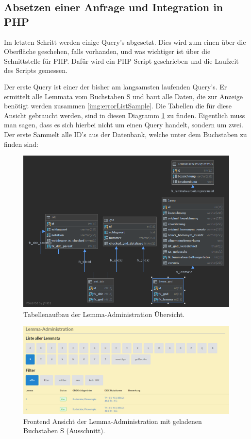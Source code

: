 \subsection{Absetzen einer Anfrage und Integration in PHP}

Im letzten Schritt werden einige Query’s abgesetzt. Dies wird zum einen über die Oberfläche geschehen, falls vorhanden, und was wichtiger ist über die Schnittstelle für PHP. Dafür wird ein PHP-Script geschrieben und die Laufzeit des Scripts gemessen.

Der erste Query ist einer der bisher am langsamsten laufenden Query’s. Er ermittelt alle Lemmata vom Buchstaben S und baut alle Daten, die zur Anzeige benötigt werden zusammen \ref{img:errorListSample}. Die Tabellen die für diese Ansicht gebraucht werden, sind in diesen Diagramm \ref{img:lAdminStructure} zu finden. Eigentlich muss man sagen, dass es sich hierbei nicht um einen Query handelt, sondern um zwei. Der erste Sammelt alle ID’s aus der Datenbank, welche unter dem Buchstaben zu finden sind:

\begin{figure}
	\centering
	\includegraphics[width=0.8\linewidth]{images/structure_lemmaadministration.png}
	\caption{Tabellenaufbau der Lemma-Administration Übersicht.}
	\label{img:lAdminStructure}
\end{figure}

\begin{figure}
	\centering
	\includegraphics[width=1\linewidth]{images/lemmaadministration_sample.PNG}
	\caption{Frontend Ansicht der Lemma-Administration mit geladenen Buchstaben S (Ausschnitt).}
	\label{img:lAdminSample}
\end{figure}

